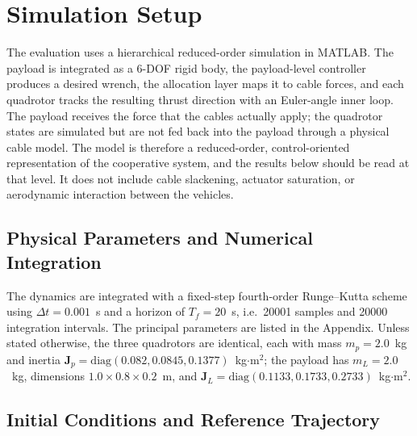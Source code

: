 \documentclass[Review,sageh,times]{sagej}
\begin{document}
\section*{Simulation Setup}

The evaluation uses a hierarchical reduced-order simulation in MATLAB. The
payload is integrated as a 6-DOF rigid body, the payload-level controller
produces a desired wrench, the allocation layer maps it to cable forces, and
each quadrotor tracks the resulting thrust direction with an Euler-angle inner
loop. The payload receives the force that the cables actually apply; the
quadrotor states are simulated but are not fed back into the payload through a
physical cable model. The model is therefore a reduced-order,
control-oriented representation of the cooperative system, and the results
below should be read at that level. It does not include cable slackening,
actuator saturation, or aerodynamic interaction between the vehicles.

\subsection*{Physical Parameters and Numerical Integration}

The dynamics are integrated with a fixed-step fourth-order Runge--Kutta
scheme using $\Delta t=0.001$~s and a horizon of $T_f=20$~s, i.e.\ 20001 samples
and 20000 integration intervals. The principal parameters are listed in the
Appendix. Unless stated otherwise, the three quadrotors are identical, each
with mass $m_p=2.0$~kg and inertia $\mathbf{J}_p=\mathrm{diag}(0.082,0.0845,0.1377)$~kg$\cdot$m$^2$;
the payload has $m_L=2.0$~kg, dimensions $1.0\times0.8\times0.2$~m, and
$\mathbf{J}_L=\mathrm{diag}(0.1133,0.1733,0.2733)$~kg$\cdot$m$^2$.

\subsection*{Initial Conditions and Reference Trajectory}
\end{document}
